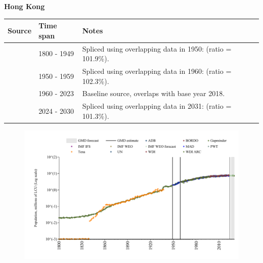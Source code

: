\documentclass[12pt,a4paper,landscape]{article}
\begin{document}
\begin{adjustbox}{max totalsize={\paperwidth}{\paperheight},center}
\begin{minipage}[t][\textheight][t]{\textwidth}
\vspace*{0.5cm}
{}
\begin{center}
{\Large\bfseries Hong Kong}
\end{center}
\vspace{0.5cm}
\begin{table}[H]
\centering
\small
\begin{tabular}{|l|l|l|}
\hline
\textbf{Source} & \textbf{Time span} & \textbf{Notes} \\
\hline
\rowcolor{white}\cite{Gapminder}& 1800 - 1949 &Spliced using overlapping data in 1950: (ratio = 101.9\%).\\
\rowcolor{lightgray}\cite{IMF_IFS}& 1950 - 1959 &Spliced using overlapping data in 1960: (ratio = 102.3\%).\\
\rowcolor{white}\cite{WDI}& 1960 - 2023 &Baseline source, overlaps with base year 2018.\\
\rowcolor{lightgray}\cite{Gapminder}& 2024 - 2030 &Spliced using overlapping data in 2031: (ratio = 101.3\%).\\
\hline
\end{tabular}
\end{table}
\begin{figure}[H]
\centering
\includegraphics[width=\textwidth,height=0.6\textheight,keepaspectratio]{graphs/HKG_pop.pdf}
\end{figure}
\end{minipage}
\end{adjustbox}
\end{document}
